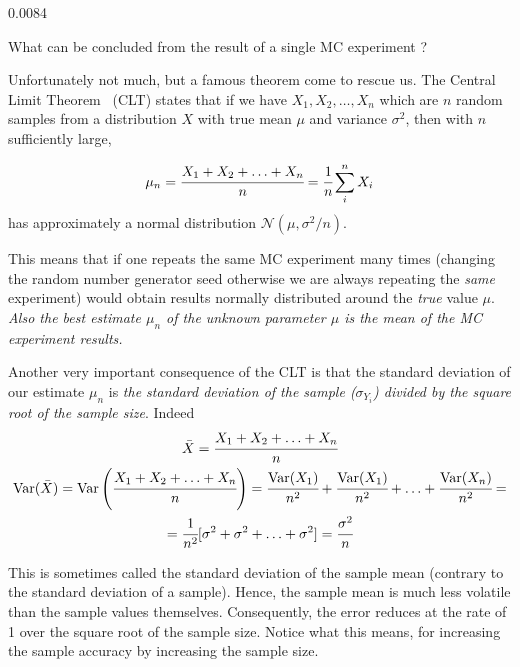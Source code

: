 \begin{ioutput}
0.0084
\end{ioutput}

What can be concluded from the result of a single MC experiment ?

Unfortunately not much, but a famous theorem come to rescue us.
The Central Limit Theorem~\cite{bib:central_limit} (CLT) states that if we have $X_1, X_2,\dots, X_n$ which are $n$ random samples from a distribution $X$ with true mean $\mu$ and variance $\sigma^{2}$, then with $n$ sufficiently large,

\begin{equation*} 
\mu_n = \cfrac{X_1 + X_2 +\ldots + X_n}{n} = \cfrac{1}{n}\sum_i^n X_i
\end{equation*}
has approximately a normal distribution $\mathcal{N}(\mu, \sigma^2/n)$.

This means that if one repeats the same MC experiment many times (changing the random number generator seed otherwise we are always repeating the \emph{same} experiment) would obtain results normally distributed around the \emph{true} value $\mu$. \emph{Also the best estimate $\mu_n$ of the unknown parameter $\mu$ is the mean of the MC experiment results.}

Another very important consequence of the CLT is that the standard deviation of our estimate $\mu_n$ is \emph{the standard deviation of the sample ($\sigma_{Y_i}$) divided by the square root of the sample size}. Indeed
\begin{equation*}
\begin{gathered}
\bar{X} = \cfrac{X_1 + X_2 +\ldots +X_n}{n}\\
\text{Var}(\bar{X}) = \text{Var}\left(\cfrac{X_1 + X_2 +\ldots +X_n}{n}\right)=\cfrac{\text{Var}(X_1)}{n^2}+\cfrac{\text{Var}(X_1)}{n^2}+\ldots+\cfrac{\text{Var}(X_n)}{n^2} = \\
=\cfrac{1}{n^2}[\sigma^2+\sigma^2+\ldots+\sigma^2] = \cfrac{\sigma^2}{n}
\end{gathered}
\end{equation*}

This is sometimes called the standard deviation of the sample mean (contrary to the standard deviation of a sample). Hence, the sample mean is much less volatile than the sample values themselves. Consequently, the error reduces at the rate of 1 over the square root of the sample size. Notice what this means, for increasing the sample accuracy by increasing the sample size.

